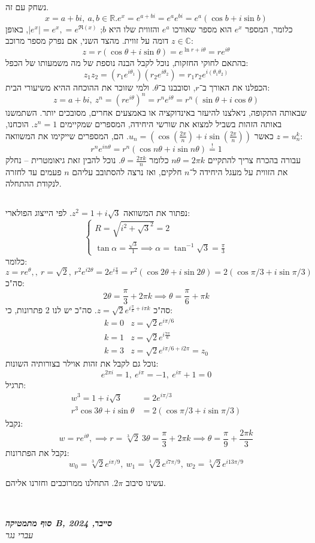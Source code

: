 \documentclass[]{article}
\newcommand\ndoc  {\dotfill \\ \vfil {\begin{center} {\textbf{\textit{סוף מתמטיקה B, סייבר, 2024}} \\ \scriptsize \textit{עברי נגר}} \end{center}} \vfil	}
\newcommand\R     {\mathbb{R}}
\newcommand\C     {\mathbb{C}}
\newcommand\cost  {\cos \theta}
\newcommand\sint  {\sin \theta}
\newcommand\seq   {\overset{!}{=}}
\newcommand\ta    {\theta}
\newcommand\op    {^{-1}}
\newcommand\cl [1]    {\left ( #1 \right )}
\begin{document}
	נשחק עם זה.
	\[ x = a + bi, \ a, b \in \R. e^{x} = e^{a + bi} = e^{a}e^{bi} = e^{a}(\cos b + i \sin b) \]
	כלומר, המספר $e^x$ הוא מספר שאורכו $e^a$ והזווית שלו היא $b$; $|e^x| = e^x, = e^{\Re(x)}$, באופן דומה על זווית. מהצד השני, אם נפרק מספר מרוכב $z \in \C$: 
	\[ z = r(\cost + i \sint) = e^{\ln r + i \ta} = re^{i\ta} \]
	בהתאם לחוקי החזקות, נוכל לקבל הבנה נוספת של מה משמעותו של הכפל:
	\[ z_1z_2 = (r_1e^{i\ta_1})(r_2e^{i\ta_2}) = r_1r_2e^{i(\ta_1\ta_2)} \]
	הכפלנו את האורך ב־$r$, וסובבנו ב־$\ta$. ולמי שזוכר את ההוכחה ההיא משיעורי הבית: 
	\[ z = a + bi, \ z^{n} = (re^{i\ta})^{n} = r^ne^{i\ta} = r^n(\sin\ta + i\cos\ta) \]
	שבאותה התקופה, ניאלצנו להיעזר באינדוקציה או באמצעים אחרים, מסובכים יותר. השתמשנו באותה הזהות בשביל למצוא את שורשי היחידה, המספרים שמקיימים $z^n = 1$. הוכחנו, $z = u_n^k$ כאשר $u_n = \cl{\cos \cl{\frac{2\pi}{n}} + i \sin \cl{\frac{2\pi}{n}}}$. הם, המספרים שייקימו את המשוואה: 
	\[ r^ne^{in\ta} = r^n(\cos n \ta + i \sin n \ta) \seq 1 \]
	עבורה בהכרח צריך להתקיים $n\ta = 2 \pi k$ כלומר $\ta = \frac{2\pi k}{n}$. נוכל להבין זאת גיאומטרית – נחלק את הזווית על מעגל היחידה ל־$n$ חלקים, ואז נרצה להסתובב עליהם $n$ פעמים עד לחזרה לנקודת ההתחלה. 
	
	\subsection{}
	נפתור את המשוואה 
	$z^2 = 1 + i \sqrt3$.
	לפי הייצוג הפולארי: 
	\[ \begin{cases}
		R = \sqrt{i^2 + \sqrt3^2} = 2 \\
		\tan\alpha = \frac{\sqrt3}{1} \implies \alpha = \tan\op\sqrt3 = \frac{\pi}{3}
	\end{cases} \]
	כלומר: 
	\[ z = re^\ta, , \ r = \sqrt 2, \ r^2e^{i2\ta} = 2 e^{i \frac{\pi}{3}} = r^2(\cos2\ta + i \sin2\ta) = 2(\cos\pi/3 + i \sin \pi/3) \]
	סה"כ: 
	\[ 2\ta = \frac{\pi}{3} + 2 \pi k \implies \ta = \frac{\pi}{6} + \pi k \]
	סה"כ $z = \sqrt2 e^{i\frac{\pi}{k} + i\pi k }$. סה"כ יש לנו 2 פתרונות, כי: 
	\begin{align}
		k = 0 & z = \sqrt2e^{i\pi/6} \\
		k = 1 & z = \sqrt2e^{i \frac{7\pi}{6}} \\
		k = 3 & z = \sqrt2e^{i \pi/6 + i 2\pi} = z_0
	\end{align}
	נוכל גם לקבל את זהות אוילר בצורותיה השונות: 
	\[ e^{2\pi i} = 1, \ e^{i\pi} = -1, \ e^{i\pi} + 1 = 0 \]
	תרגיל: 
	\begin{align}
		w^3 = 1 + i \sqrt3 &= 2e^{i\pi/3} \\
		r^3\cos3\ta + i \sin \ta &= 2\cl{\cos \pi/3 + i \sin \pi/3}
	\end{align}
	נקבל: 
	\[ w = re^{i\ta}, \implies r = \sqrt[3]{2} \ 3 \ta = \frac{\pi}{3} + 2 \pi k \implies \ta = \frac{\pi}{9} + \frac{2\pi k}{3} \]
	נקבל את הפתרונות: 
	\[ w_0 = \sqrt[3]{2}e^{i \pi/9}, \ w_1 = \sqrt[3]{2}e^{i7\pi/9}, \ w_2 = \sqrt[3]{2}e^{i 13 \pi /9} \]
	
	
	עשינו סיבוב $2\pi$. התחלנו ממרוכבים וחזרנו אליהם. 
	
	\ndoc
	
\end{document}
